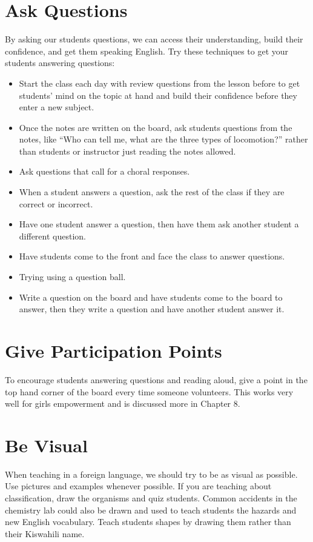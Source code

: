 \section{Ask Questions}
By asking our students questions, we can access their understanding, build their confidence, and get them speaking English. Try these techniques to get your students answering questions:
\begin{itemize}
\item Start the class each day with review questions from the lesson before to get students' mind on the topic at hand and build their confidence before they enter a new subject.
\item Once the notes are written on the board, ask students questions from the notes, like ``Who can tell me, what are the three types of locomotion?'' rather than students or instructor just reading the notes allowed.
\item Ask questions that call for a choral responses.
\item When a student answers a question, ask the rest of the class if they are correct or incorrect.
\item Have one student answer a question, then have them ask another student a different question.
\item Have students come to the front and face the class to answer questions.
\item Trying using a question ball.
\item Write a question on the board and have students come to the board to answer, then they write a question and have another student answer it.
\end{itemize}

\section{Give Participation Points}
To encourage students answering questions and reading aloud, give a point in the top hand corner of the board every time someone volunteers.   This works very well for girls empowerment and is discussed more in Chapter 8.\\

\section{Be Visual}
When teaching in a foreign language, we should try to be as visual as possible.  Use pictures and examples whenever possible.  If you are teaching about classification, draw the organisms and quiz students.  Common accidents in the chemistry lab could also be drawn and used to teach students the hazards and new English vocabulary.   Teach students shapes by drawing them rather than their Kiswahili name.\\ 

